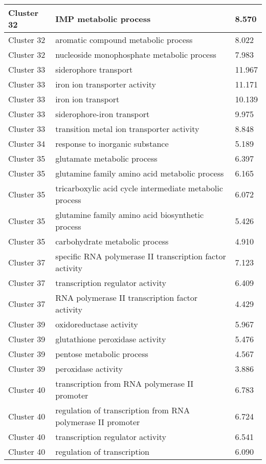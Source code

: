 {\begin{longtable}{|p{1in}|p{4in}|p{1in}|}
Cluster 32 & IMP metabolic process & 8.570 \\ \hline
Cluster 32 & aromatic compound metabolic process & 8.022 \\ \hline
Cluster 32 & nucleoside monophosphate metabolic process & 7.983 \\ \hline
Cluster 33 & siderophore transport & 11.967 \\ \hline
Cluster 33 & iron ion transporter activity & 11.171 \\ \hline
Cluster 33 & iron ion transport & 10.139 \\ \hline
Cluster 33 & siderophore-iron transport & 9.975 \\ \hline
Cluster 33 & transition metal ion transporter activity & 8.848 \\ \hline
Cluster 34 & response to inorganic substance & 5.189 \\ \hline
Cluster 35 & glutamate metabolic process & 6.397 \\ \hline
Cluster 35 & glutamine family amino acid metabolic process & 6.165 \\ \hline
Cluster 35 & tricarboxylic acid cycle intermediate metabolic process & 6.072 \\ \hline
Cluster 35 & glutamine family amino acid biosynthetic process & 5.426 \\ \hline
Cluster 35 & carbohydrate metabolic process & 4.910 \\ \hline
Cluster 37 & specific RNA polymerase II transcription factor activity & 7.123 \\ \hline
Cluster 37 & transcription regulator activity & 6.409 \\ \hline
Cluster 37 & RNA polymerase II transcription factor activity & 4.429 \\ \hline
Cluster 39 & oxidoreductase activity & 5.967 \\ \hline
Cluster 39 & glutathione peroxidase activity & 5.476 \\ \hline
Cluster 39 & pentose metabolic process & 4.567 \\ \hline
Cluster 39 & peroxidase activity & 3.886 \\ \hline
Cluster 40 & transcription from RNA polymerase II promoter & 6.783 \\ \hline
Cluster 40 & regulation of transcription from RNA polymerase II promoter & 6.724 \\ \hline
Cluster 40 & transcription regulator activity & 6.541 \\ \hline
Cluster 40 & regulation of transcription & 6.090 \\ \hline

\end{longtable}}
